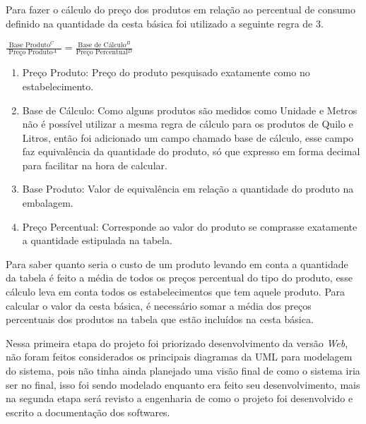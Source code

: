 \documentclass{ifto-tex}
\begin{document}
Para fazer o cálculo do preço dos produtos em relação ao percentual de consumo definido na quantidade da cesta básica foi utilizado a seguinte regra de 3.

\begin{center}	
	$\displaystyle\frac{\mbox {Base Produto$^{C}$ }}{\mbox { Preço Produto$^{A}$ }}=\frac{\mbox {Base de Cálculo$^{B}$} }{\mbox {Preço Percentual$^{D}$}}$
\end{center}

\begin{enumerate}[label=(\Alph*)]
	\item Preço Produto: Preço do produto pesquisado exatamente como no estabelecimento.
	\item Base de Cálculo: Como alguns produtos são medidos como Unidade e Metros não é possível utilizar a mesma regra de cálculo para os produtos de Quilo e Litros, então foi adicionado um campo chamado base de cálculo, esse campo faz equivalência da quantidade do produto, só que expresso em forma decimal para facilitar na hora de calcular.
	\item Base Produto: Valor de equivalência em relação a quantidade do produto na embalagem.
	\item Preço Percentual: Corresponde ao valor do produto se comprasse exatamente a quantidade estipulada na tabela.
	
\end{enumerate}

Para saber quanto seria o custo de um produto levando em conta a quantidade da tabela é feito a média de todos os preços percentual do tipo do produto, esse cálculo leva em conta todos os estabelecimentos que tem aquele produto. Para calcular o valor da cesta básica, é necessário somar a média dos preços percentuais dos produtos na tabela que estão incluídos na cesta básica.

Nessa primeira etapa do projeto foi priorizado desenvolvimento da versão \textit{Web}, não foram feitos considerados os principais diagramas da UML para modelagem do sistema, pois não tinha ainda planejado uma visão final de como o sistema iria ser no final, isso foi sendo modelado enquanto era feito seu desenvolvimento, mais na segunda etapa será revisto a engenharia de como o projeto foi desenvolvido e escrito a documentação dos softwares.
\end{document}
